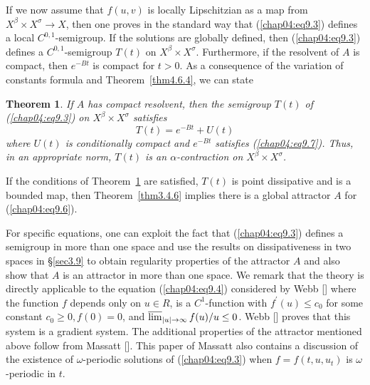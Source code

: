 \documentclass{surv-l}
\theoremstyle{plain}
\newtheorem{theorem}{Theorem}[section]
\theoremstyle{definition}
\numberwithin{equation}{section}
\numberwithin{figure}{chapter}
\begin{document}
If we now assume that $f(u, v)$ is locally Lipschitzian as a map from $ X^{\beta}\times X^{\sigma}\rightarrow X$, then one proves in the standard way that (\ref{chap04:eq9.3}) defines a local $C^{0,1}$-semigroup. If the solutions are globally defined, then (\ref{chap04:eq9.3}) defines a $C^{0,1}$-semigroup $T(t)$ on $X^{\beta}\times X^{\sigma}$. Furthermore, if the resolvent of $A$ is compact, then $e^{-Bt}$ is compact for $t>0$. As a consequence of the variation of constants formula and Theorem~\ref{thm4.6.4}, we can state

\begin{theorem}\label{thm4.9.2}
If $A$ has compact resolvent, then the semigroup $T(t)$ of \emph{(\ref{chap04:eq9.3})} on $X^{\beta}\times X^{\sigma}$ satisfies
\begin{equation*}
T(t)=e^{-Bt}+U(t)
\end{equation*}
where $U(t)$ is conditionally compact and $e^{-Bt}$ satisfies \emph{(\ref{chap04:eq9.7})}. Thus, in an
appropriate norm, $T(t)$ is an $\alpha$-contraction on $X^{\beta}\times X^{\sigma}$.
\end{theorem}

If the conditions of Theorem~\ref{thm4.9.2} are satisfied, $T(t)$ is point dissipative and is a bounded map, then Theorem~\ref{thm3.4.6} implies there is a global attractor $A$ for (\ref{chap04:eq9.6}).

For specific equations, one can exploit the fact that (\ref{chap04:eq9.3}) defines a semigroup in more than one space and use the results on dissipativeness in two spaces in \S\ref{sec3.9} to obtain regularity properties of the attractor $A$ and also show that $A$ is an attractor in more than one space. We remark that the theory is directly applicable to the equation (\ref{chap04:eq9.4}) considered by Webb [\citeyear{1980w}] where the function $f$ depends only on $u\in R$, is a $C^{1}$-function with $f^{\prime}(u)\leq c_{0}$ for some constant $c_{0}\geq 0, f(0)=0$, and $\varlimsup_{|u|\rightarrow\infty}f(u)/u\leq 0$. Webb [\citeyear{1980w}] proves that this system is a gradient system. The additional properties of the attractor mentioned above follow from Massatt [\citeyear{1983m}]. This paper of Massatt also contains a discussion of the existence of $\omega$-periodic solutions of (\ref{chap04:eq9.3}) when $f=f(t, u, u_{t})$ is $\omega$-periodic in $t$.
\end{document}
